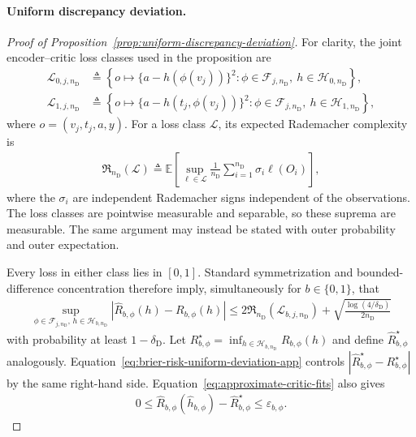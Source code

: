 \paragraph{Uniform discrepancy deviation.}
\begin{proof}[Proof of Proposition~\ref{prop:uniform-discrepancy-deviation}]
For clarity, the joint encoder--critic loss classes used in the proposition are
\begin{align}
\mathcal L_{0,j,n_{\mathrm D}}
&\triangleq
\left\{
o\mapsto\{a-h(\phi(v_j))\}^2:
\phi\in\mathcal F_{j,n_{\mathrm D}},\ h\in\mathcal H_{0,n_{\mathrm D}}
\right\},\\
\mathcal L_{1,j,n_{\mathrm D}}
&\triangleq
\left\{
o\mapsto\{a-h(t_j,\phi(v_j))\}^2:
\phi\in\mathcal F_{j,n_{\mathrm D}},\ h\in\mathcal H_{1,n_{\mathrm D}}
\right\},
\label{eq:joint-encoder-critic-loss-classes-app}
\end{align}
where $o=(v_j,t_j,a,y)$. For a loss class $\mathcal L$, its expected Rademacher complexity is
\begin{align}
\mathfrak R_{n_{\mathrm D}}(\mathcal L)
\triangleq
\mathbb E\!\left[
\sup_{\ell\in\mathcal L}
\frac1{n_{\mathrm D}}\sum_{i=1}^{n_{\mathrm D}}\sigma_i\ell(O_i)
\right],
\label{eq:expected-rademacher-complexity-app}
\end{align}
where the $\sigma_i$ are independent Rademacher signs independent of the observations. The loss classes are pointwise measurable and separable, so these suprema are measurable.
The same argument may instead be stated with outer probability and outer expectation.

Every loss in either class lies in $[0,1]$. Standard symmetrization and bounded-difference concentration therefore imply, simultaneously for $b\in\{0,1\}$, that
\begin{align}
\sup_{\phi\in\mathcal F_{j,n_{\mathrm D}},\,h\in\mathcal H_{b,n_{\mathrm D}}}
|\widehat R_{b,\phi}(h)-R_{b,\phi}(h)|
\le
2\mathfrak R_{n_{\mathrm D}}(\mathcal L_{b,j,n_{\mathrm D}})
+\sqrt{\frac{\log(4/\delta_{\mathrm D})}{2n_{\mathrm D}}}
\label{eq:brier-risk-uniform-deviation-app}
\end{align}
with probability at least $1-\delta_{\mathrm D}$. Let $R_{b,\phi}^{\star}=\inf_{h\in\mathcal H_{b,n_{\mathrm D}}}R_{b,\phi}(h)$ and define $\widehat R_{b,\phi}^{\star}$ analogously. Equation~\eqref{eq:brier-risk-uniform-deviation-app} controls $|\widehat R_{b,\phi}^{\star}-R_{b,\phi}^{\star}|$ by the same right-hand side. Equation~\eqref{eq:approximate-critic-fits} also gives
\begin{align}
0
\le
\widehat R_{b,\phi}(\widehat h_{b,\phi})
-\widehat R_{b,\phi}^{\star}
\le
\varepsilon_{b,\phi}.
\label{eq:critic-optimization-gap-app}
\end{align}


\end{proof}
